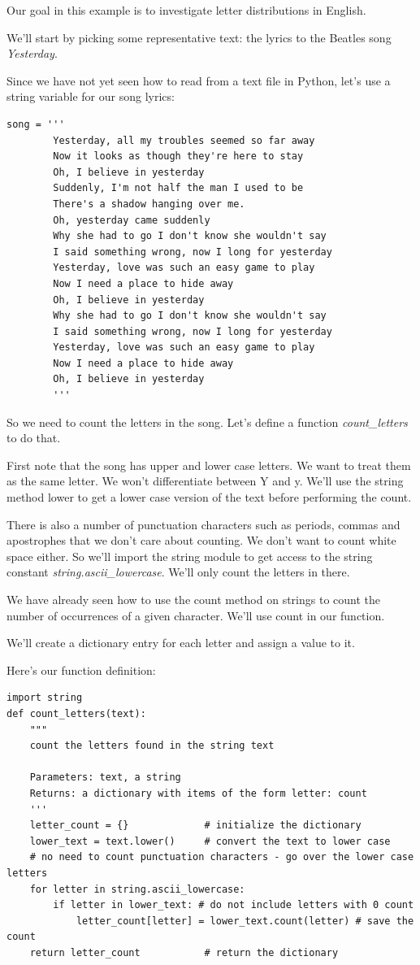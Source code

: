 \documentclass{article}
\begin{document}
Our goal in this example is to investigate letter distributions in English.

We’ll start by picking some representative text:  the lyrics to the Beatles song \textit{Yesterday}.

Since we have not yet seen how to read from a text file in Python, let's use a string variable for our song lyrics:

\begin{lstlisting}
song = '''
        Yesterday, all my troubles seemed so far away
        Now it looks as though they're here to stay
        Oh, I believe in yesterday
        Suddenly, I'm not half the man I used to be
        There's a shadow hanging over me.
        Oh, yesterday came suddenly
        Why she had to go I don't know she wouldn't say
        I said something wrong, now I long for yesterday
        Yesterday, love was such an easy game to play
        Now I need a place to hide away
        Oh, I believe in yesterday
        Why she had to go I don't know she wouldn't say
        I said something wrong, now I long for yesterday
        Yesterday, love was such an easy game to play
        Now I need a place to hide away
        Oh, I believe in yesterday
        '''
\end{lstlisting}
        
So we need to count the letters in the song.  Let's define a function \textit{count{\_}letters} to do that.

First note that the song has upper and lower case letters.  We want to treat them as the same letter.  We won't differentiate between Y and y.  We'll use the string method lower to get a lower case version of the text before performing the count.  

There is also a number of punctuation characters such as periods, commas and apostrophes that we don't care about counting.  We don't want to count white space either.  So we'll import the string module to get access to the string constant \textit{string.ascii{\_}lowercase}.  We'll only count the letters in there.

We have already seen how to use the count method on strings to count the number of occurrences of a given character.  We'll use count in our function.

We'll create a dictionary entry for each letter and assign a value to it.

Here's our function definition: 

\begin{lstlisting}
import string
def count_letters(text):
    """
    count the letters found in the string text

    Parameters: text, a string
    Returns: a dictionary with items of the form letter: count
    '''
    letter_count = {}             # initialize the dictionary
    lower_text = text.lower()     # convert the text to lower case
    # no need to count punctuation characters - go over the lower case letters
    for letter in string.ascii_lowercase:
        if letter in lower_text: # do not include letters with 0 count
            letter_count[letter] = lower_text.count(letter) # save the count
    return letter_count           # return the dictionary
\end{lstlisting}
\end{document}
